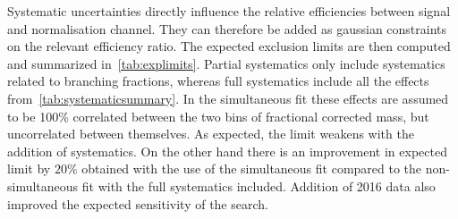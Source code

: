 Systematic uncertainties directly influence the relative efficiencies between signal and normalisation channel. They can therefore be added as gaussian constraints on the relevant efficiency ratio. The expected exclusion limits are then computed and summarized in~\autoref{tab:explimits}. Partial systematics only include systematics related to branching fractions, whereas full systematics include all the effects from~\autoref{tab:systematicsummary}. In the simultaneous fit these effects are assumed to be 100\% correlated between the two bins of fractional corrected mass, but uncorrelated between themselves. As expected, the limit weakens with the addition of systematics. On the other hand there is an improvement in expected limit by $20\%$ obtained with the use of the simultaneous fit compared to the non-simultaneous fit with the full systematics included. Addition of 2016 data also improved the expected sensitivity of the search. 

